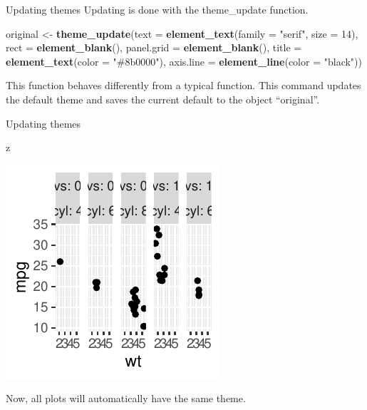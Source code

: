 \documentclass[
  ignorenonframetext,
]{beamer}
\newenvironment{Shaded}{\begin{snugshade}}{\end{snugshade}}
\newcommand{\AttributeTok}[1]{\textcolor[rgb]{0.13,0.29,0.53}{#1}}
\newcommand{\DecValTok}[1]{\textcolor[rgb]{0.00,0.00,0.81}{#1}}
\newcommand{\FunctionTok}[1]{\textcolor[rgb]{0.13,0.29,0.53}{\textbf{#1}}}
\newcommand{\NormalTok}[1]{#1}
\newcommand{\OtherTok}[1]{\textcolor[rgb]{0.56,0.35,0.01}{#1}}
\newcommand{\StringTok}[1]{\textcolor[rgb]{0.31,0.60,0.02}{#1}}
\begin{document}
\begin{frame}[fragile]{Updating themes}
\label{updating-themes}
Updating is done with the theme\_update function.


\begin{Shaded}
\begin{Highlighting}[]
\NormalTok{original }\OtherTok{\textless{}{-}} \FunctionTok{theme\_update}\NormalTok{(}\AttributeTok{text =} \FunctionTok{element\_text}\NormalTok{(}\AttributeTok{family =} \StringTok{"serif"}\NormalTok{,}
    \AttributeTok{size =} \DecValTok{14}\NormalTok{), }\AttributeTok{rect =} \FunctionTok{element\_blank}\NormalTok{(), }\AttributeTok{panel.grid =} \FunctionTok{element\_blank}\NormalTok{(),}
    \AttributeTok{title =} \FunctionTok{element\_text}\NormalTok{(}\AttributeTok{color =} \StringTok{"\#8b0000"}\NormalTok{), }\AttributeTok{axis.line =} \FunctionTok{element\_line}\NormalTok{(}\AttributeTok{color =} \StringTok{"black"}\NormalTok{))}
\end{Highlighting}
\end{Shaded}

This function behaves differently from a typical function. This command
updates the default theme and saves the current default to the object
``original''.
\end{frame}

\begin{frame}[fragile]{Updating themes}
\label{updating-themes-1}
\begin{Shaded}
\begin{Highlighting}[]
\NormalTok{z}
\end{Highlighting}
\end{Shaded}

\begin{center}\includegraphics[width=0.5\linewidth]{Figs/unnamed-chunk-85-1} \end{center}

Now, all plots will automatically have the same theme.
\end{frame}
\end{document}
